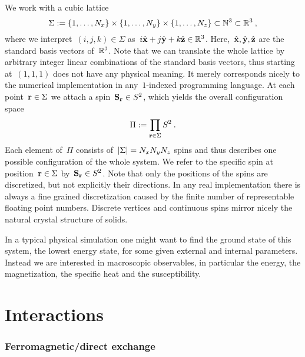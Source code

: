 We work with a cubic lattice
%
\begin{equation}
  \Sigma := \{1,\dots,N_x\} \times \{1,\dots,N_y\} \times
  \{1,\dots,N_z\} \subset \mathbb{N}^3 \subset \mathbb{R}^3\:,
\end{equation}
%
where we interpret~$(i,j,k) \in \Sigma$ as~$i \hat{\mathbf{x}} + j \hat{\mathbf{y}} + k \hat{\mathbf{z}}
\in \mathbb{R}^3$. Here,~$\hat{\mathbf{x}}, \hat{\mathbf{y}}, \hat{\mathbf{z}}$ are the standard basis vectors of~$\mathbb{R}^3$.
Note that we can translate the whole lattice by arbitrary integer linear
combinations of the standard basis vectors, thus starting at~$(1,1,1)$ does not
have any physical meaning. It merely corresponds nicely to the numerical
implementation in any~$1$-indexed programming language. At each point~$\mathbf{r} \in
\Sigma$ we attach a spin~$\mathbf{S}_{\mathbf{r}} \in S^2$, which yields the overall
configuration space
%
\begin{equation}
  \Pi := \prod_{\mathbf{r} \in \Sigma} S^2\:.
\end{equation}
%
Each element of~$\Pi$ consists of~$\abs{\Sigma}=N_x N_y N_z$ spins and thus
describes one possible configuration of the whole system. We refer to the
specific spin at position~$\mathbf{r} \in \Sigma$ by~$\mathbf{S}_{\mathbf{r}} \in S^2$. Note that only
the positions of the spins are discretized, but not explicitly their directions.
In any real implementation there is always a fine grained discretization caused
by the finite number of representable floating point numbers. Discrete vertices
and continuous spins mirror nicely the natural crystal structure of solids.

In a typical physical simulation one might want to find the ground state of this
system, \ie{} the lowest energy state, for some given external and internal
parameters. Instead we are interested in macroscopic observables, in particular
the energy, the magnetization, the specific heat and the susceptibility.
%
\section{Interactions}\label{sec:interactions}
%
\subsubsection{Ferromagnetic/direct exchange}


